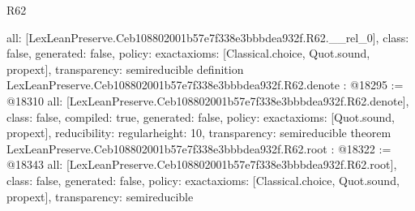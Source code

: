 \begin{lexlean}{R62}
\begin{coremodule}
{  all: [LexLeanPreserve.Ceb108802001b57e7f338e3bbbdea932f.R62.__rel_0],
  class: false,
  generated: false,
  policy: exact{axioms: [Classical.choice, Quot.sound, propext]},
  transparency: semireducible
}
definition LexLeanPreserve.Ceb108802001b57e7f338e3bbbdea932f.R62.denote : @18295 := @18310 {
  all: [LexLeanPreserve.Ceb108802001b57e7f338e3bbbdea932f.R62.denote],
  class: false,
  compiled: true,
  generated: false,
  policy: exact{axioms: [Quot.sound, propext]},
  reducibility: regular{height: 10},
  transparency: semireducible
}
theorem LexLeanPreserve.Ceb108802001b57e7f338e3bbbdea932f.R62.root : @18322 := @18343 {
  all: [LexLeanPreserve.Ceb108802001b57e7f338e3bbbdea932f.R62.root],
  class: false,
  generated: false,
  policy: exact{axioms: [Classical.choice, Quot.sound, propext]},
  transparency: semireducible
}


\end{coremodule}
\end{lexlean}
